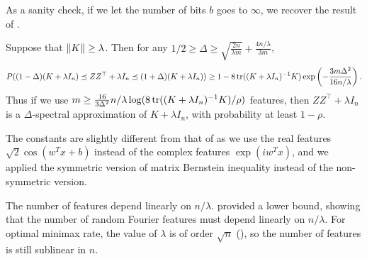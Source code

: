 As a sanity check, if we let the number of bits $b$ goes to $\infty$, we recover the
result of \citet{avron17}.
\begin{corollary}
  Suppose that $\|K\| \geq \lambda$.
  Then for any $1/2 \geq \Delta \geq \sqrt{\frac{2n}{\lambda m}} + \frac{4n/\lambda}{3m}$,
  \begin{equation*}
    P((1 - \Delta)(K + \lambda I_n) \preceq Z Z^\top + \lambda I_n \preceq (1 + \Delta)(K + \lambda I_n)) \geq 1 - 8 \mathop{\rm tr}((K +
    \lambda I_n)^{-1} K) \exp \left( -\frac{3m \Delta^2}{16n/\lambda} \right).
  \end{equation*}
  Thus if we use $m \geq \frac{16}{3 \Delta^2} n/\lambda \log (8 \mathop{\rm tr}((K + \lambda I_n)^{-1} K) / \rho)$
  features, then $Z Z^\top + \lambda I_n$ is a $\Delta$-spectral approximation of $K + \lambda I_n$,
  with probability at least $1 - \rho$.
\end{corollary}
The constants are slightly different from that of \citet{avron17} as we use the
real features $\sqrt{2} \cos(w^T x + b)$ instead of the complex features $\exp(i
w^T x)$, and we applied the symmetric version of matrix Bernstein inequality
instead of the non-symmetric version.

The number of features depend linearly on $n/ \lambda$.
\citet{avron17} provided a lower bound, showing that the number of random Fourier features
must depend linearly on $n / \lambda$.
For optimal minimax rate, the value of $\lambda$ is of order $\sqrt{n}$ (), so the number of features is still sublinear in $n$.

